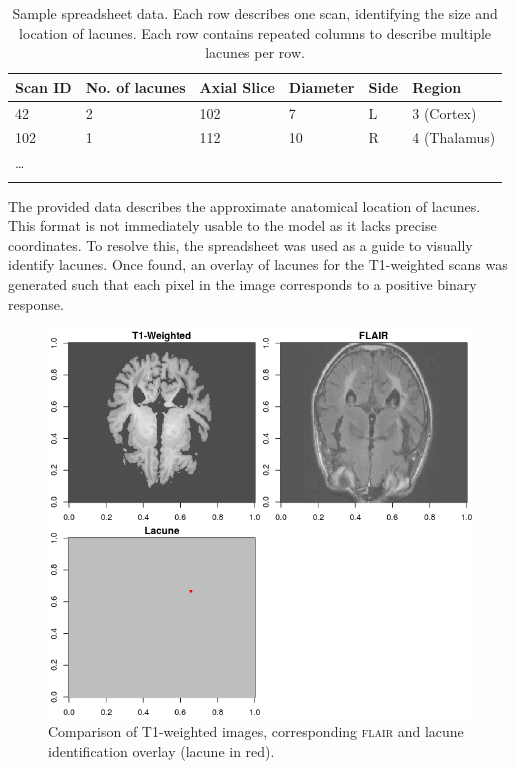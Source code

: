 \begin{table}[ht]
	\centering
	\begin{tabular}{llllll}
	\toprule[1.5pt]
	Scan ID & No. of lacunes & Axial Slice & Diameter & Side & Region\\
	\midrule
	42 & 2 & 102 & 7 & L & 3 (Cortex)\\
	102 & 1 & 112 & 10 & R & 4 (Thalamus)\\
	\ldots\\
	\bottomrule[1.5pt]\\
	\end{tabular}
	\caption{Sample spreadsheet data. Each row describes one scan, identifying the size and location of lacunes. Each row contains repeated columns to describe multiple lacunes per row.}
	\label{data-excel-tab}
\end{table}

The provided data describes the approximate anatomical location of lacunes. This format is not immediately usable to the model as it lacks precise coordinates. To resolve this, the spreadsheet was used as a guide to visually identify lacunes. Once found, an overlay of lacunes for the T1-weighted scans was generated such that each pixel in the image corresponds to a positive binary response.

\begin{figure}[ht]
\centering
\includegraphics[width=\linewidth]{Images/6_lacune_mask.png}
\caption{Comparison of T1-weighted images, corresponding \textsc{flair} and lacune identification overlay (lacune in red).}
\label{data-t1-flair-lac}
\end{figure}

